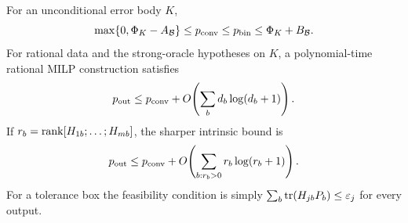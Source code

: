 \begin{theorem}\label{thm:block-psd}
For an unconditional error body $K$,
\begin{equation}\label{eq:block-psd-law}
 \max\{0,\Phi_K-A_{\mathcal B}\}\le p_{\mathrm{conv}}\le p_{\mathrm{bin}}
                                       \le\Phi_K+B_{\mathcal B}.
\end{equation}
For rational data and the strong-oracle hypotheses on $K$, a
polynomial-time rational MILP construction satisfies
\[
 p_{\rm out}\le p_{\mathrm{conv}}+O\!\left(\sum_bd_b\log(d_b+1)\right).
\]
If $r_b=\operatorname{rank}[H_{1b};\ldots;H_{mb}]$, the sharper intrinsic bound is
\begin{equation}\label{eq:block-rank-count}
 p_{\rm out}\le p_{\mathrm{conv}}+
       O\!\left(\sum_{b:r_b>0}r_b\log(r_b+1)\right).
\end{equation}
For a tolerance box the feasibility condition is simply
$\sum_b\operatorname{tr}(H_{jb}P_b)\le\varepsilon_j$ for every output.
\end{theorem}
